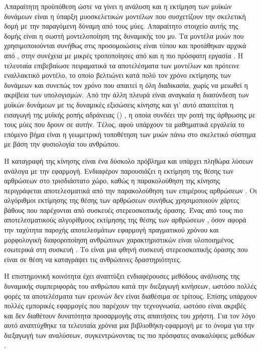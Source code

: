 Απαραίτητη προϋπόθεση ώστε να γίνει η ανάλυση και η εκτίμηση των μυϊκών δυνάμεων είναι η ύπαρξη μυοσκελετικών μοντέλων που συσχετίζουν την σκελετική δομή με την παραγόμενη δύναμη από τους μύες. Απαραίτητο στοιχείο αυτής της δομής είναι η σωστή μοντελοποίηση της δυναμικής του μυ. Τα μοντέλα μυών που χρησιμοποιούνται συνήθως στις προσομοιώσεις είναι τύπου  και προτάθηκαν αρχικά από \cite{zajac89}, στην συνέχεια με μικρές τροποποίησες από \cite{thelen03} και η πιο πρόσφατη εργασία \cite{millard13}. Η τελευταία επιβεβαίωσε πειραματικά τα αποτελέσματα των μοντέλων και πρότεινε εναλλακτικό μοντέλο, το οποίο βελτιώνει κατά πολύ τον χρόνο εκτίμησης των δυνάμεων και συνεπώς τον χρόνο που απαιτεί η όλη διαδικασία, χωρίς να μειωθεί η ακρίβεια των υπολογισμών. Από την άλλη πλευρά είναι αναγκαία η διασύνδεση των μυϊκών δυνάμεων με τις δυναμικές εξισώσεις κίνησης και γι' αυτό απαιτείται η εισαγωγή της μυϊκής ροπής αδράνειας () \cite{delp95}, η οποία συνδέει την ροπή της άρθρωσης με τους μύες που δρουν σε αυτήν. Τέλος, αφού υπάρχουν τα μαθηματικά εργαλεία το επόμενο βήμα είναι η γεωμετρική τοποθέτηση των μυών πάνω στο σκελετικό σύστημα με βάση την φυσιολογία του ανθρώπου.

Η καταγραφή της κίνησης είναι ένα δύσκολο πρόβλημα και υπάρχει πληθώρα λύσεων ανάλογα με την εφαρμογή. Ενδιαφέρον παρουσιάζει η εκτίμηση της θέσης των αρθρώσεων στο τρισδιάστατο χώρο, καθώς η παρακολούθηση της κίνησης περιγράφεται αποτελεσματικά από την παρακολούθηση των επιμέρους αρθρώσεων \cite{poppe07}. Οι αλγόριθμοι εκτίμησης της θέσης των αρθρώσεων συνήθως χρησιμοποιούν χάρτες βάθους που παρέχονται από συσκευές στερεοσκοπικής όρασης. Ένας από τους πιο αποτελεσματικούς αλγορίθμους εκτίμησης της θέσης των αρθρώσεων \cite{shotton11}, όσον αφορά την ταχύτητα παροχής αποτελεσμάτων εφαρμογή πραγματικού χρόνου και μορφολογική διαφοροποίηση ανθρώπινων χαρακτηριστικών είναι υλοποιημένος εσωτερικά στη συσκευή . Το  είναι μια φθηνή συσκευή στερεοσκοπικής όρασης που είναι σε θέση να καταγράψει τις ανθρώπινες δραστηριότητες.

Η επιστημονική κοινότητα έχει αναπτύξει ενδιαφέρουσες μεθόδους ανάλυσης της δυναμικής συμπεριφοράς του ανθρώπου κατά την διεξαγωγή κινήσεων, ωστόσο πολλές φορές τα αποτελέσματα των ερευνών δεν είναι διαθέσιμα σε τρίτους. Επίσης υπάρχουν πολλές εμπορικές εφαρμογές που παρέχουν την τεχνογνωσία, ωστόσο είναι ακριβές και δεν διαθέτουν δυνατότητα προσαρμογής στις απαιτήσεις του χρήστη. Για τον λόγο αυτό αναπτύχθηκε τα τελευταία χρόνια μια βιβλιοθήκη-εφαρμογή με το όνομα  για την διεξαγωγή των αναλύσεων, συγκεντρώνοντας τις πιο πρόσφατες ανακαλύψεις μεθόδων \cite{delp07}.

